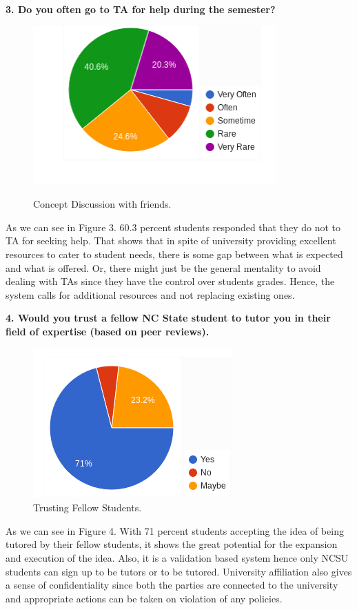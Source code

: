\documentclass{sig-alternate-05-2015}
\begin{document}
\textbf {3. Do you often go to TA for help during the semester?}
\begin{figure}[h!t]
\centering
\includegraphics{Q3SE}
\label{Q3SE}
\caption{Concept Discussion with friends.}
\end{figure}

As we can see in Figure 3. 60.3 percent students responded that they do not to TA for seeking help. That shows that in spite of university providing excellent resources to cater to student needs, there is some gap between what is expected and what is offered. Or, there might just be the general mentality to avoid dealing with TAs since they have the control over students grades. Hence, the system calls for additional resources and not replacing existing ones. 

\textbf {4. Would you trust a fellow NC State student to tutor you in their field of expertise (based on peer reviews).}
\begin{figure}[h!t]
\centering
\includegraphics{Q4SE}
\caption{Trusting Fellow Students.}
\label{Q4SE}
\end{figure}

As we can see in Figure 4. With 71 percent students accepting the idea of being tutored by their fellow students, it shows the great potential for the expansion and execution of the idea. Also, it is a validation based system hence only NCSU students can sign up to be tutors or to be tutored. University affiliation also gives a sense of confidentiality since both the parties are connected to the university and appropriate actions can be taken on violation of any policies. 
\end{document}
